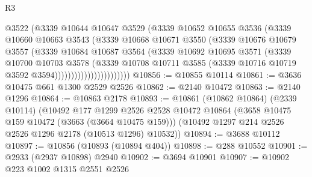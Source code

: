 \begin{lexlean}{R3}
\begin{coremodule}
                              @3522
                              (@3339
                                @10644
                                @10647
                                @3529
                                (@3339
                                  @10652
                                  @10655
                                  @3536
                                  (@3339
                                    @10660
                                    @10663
                                    @3543
                                    (@3339
                                      @10668
                                      @10671
                                      @3550
                                      (@3339
                                        @10676
                                        @10679
                                        @3557
                                        (@3339
                                          @10684
                                          @10687
                                          @3564
                                          (@3339
                                            @10692
                                            @10695
                                            @3571
                                            (@3339
                                              @10700
                                              @10703
                                              @3578
                                              (@3339
                                                @10708
                                                @10711
                                                @3585
                                                (@3339
                                                  @10716
                                                  @10719
                                                  @3592
                                                  @3594)))))))))))))))))))))))
@10856 := @10855 @10114
@10861 := @3636 @10475 @661 @1300 @2529 @2526
@10862 := @2140 @10472
@10863 := @2140 @1296
@10864 := @10863 @2178
@10893 := @10861
    (@10862 @10864)
    (@2339 @10114)
    (@10492
      @177
      @1299
      @2526
      @2528
      @10472
      @10864
      (@3658 @10475 @159 @10472 (@3663 (@3664 @10475 @159)))
      (@10492 @1297 @214 @2526 @2526 @1296 @2178 (@10513 @1296) @10532))
@10894 := @3688 @10112
@10897 := @10856 (@10893 (@10894 @404))
@10898 := @288 @10552
@10901 := @2933 (@2937 @10898) @2940
@10902 := @3694 @10901
@10907 := @10902 @223 @1002 @1315 @2551 @2526

\end{coremodule}
\end{lexlean}
